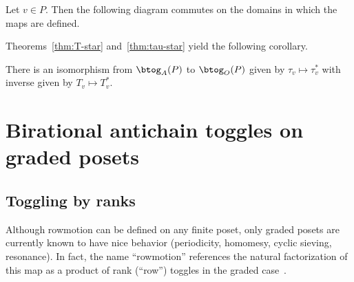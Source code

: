 \begin{absolutelynopagebreak}
\begin{theo}\label{thm:tau-star}
Let $v\in P$. Then the following diagram commutes on the domains in which the maps are defined.
\begin{center}
\end{center}
\end{theo}
\end{absolutelynopagebreak}

Theorems~\ref{thm:T-star} and~\ref{thm:tau-star}
yield the following corollary.

\begin{coro}
There is an isomorphism from $\btog_A(P)$ to
$\btog_O(P)$ given by $\tau_v \mapsto \tau_v^*$
with inverse given by $T_v \mapsto T_v^*$.
\end{coro}

\section{Birational antichain toggles on graded posets}\label{sec:graded}

\subsection{Toggling by ranks}

Although rowmotion can be defined on any finite poset,
only graded posets are currently known to have nice behavior (periodicity, homomesy, cyclic sieving, resonance).
In fact, the name ``rowmotion'' references the natural factorization of this map as a
product of rank (``row'') toggles in the graded case~\cite{strikerwilliams}.

